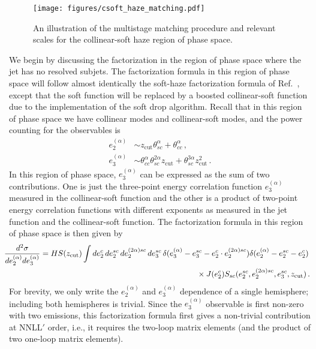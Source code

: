 \documentclass[a4paper,11pt]{article}
\newcommand{\ecf}[2]{e_{#1}^{(#2)}}
\newcommand{\nn}{\nonumber}
\def\zcut{z_{\text{cut}}}
\DeclareRobustCommand{\Ref}[1]{Ref.~\cite{#1}}
\begin{document}
\begin{figure}
\begin{center}
\texttt{[image: figures/csoft\_haze\_matching.pdf]}
\end{center}
\caption{An illustration of the multistage matching procedure and relevant scales for the collinear-soft haze region of phase space.
}
\label{fig:csoft_haze_setup}
\end{figure}

We begin by discussing the factorization in the region of phase space where the jet has no resolved subjets. The factorization formula in this region of phase space will follow almost identically the soft-haze factorization formula of \Ref{Larkoski:2015kga}, except that the soft function will be replaced by a boosted collinear-soft function due to the implementation of the soft drop algorithm. Recall that in this region of phase space we have collinear modes and collinear-soft modes, and the power counting for the observables is
\begin{align}
\ecf{2}{\alpha} &\sim \zcut \theta_{sc}^\alpha +\theta_{cc}^\alpha\,, \nn \\
\ecf{3}{\alpha} &\sim \theta_{cc}^\alpha \theta_{sc}^{2\alpha} \zcut+\theta_{sc}^{3\alpha} \zcut^2\,.
\end{align}
In this region of phase space, $\ecf{3}{\alpha}$ can be expressed as the sum of two contributions.  One is just the three-point energy correlation function $\ecf{3}{\alpha}$ measured in the collinear-soft function and the other is a product of two-point energy correlation functions with different exponents as measured in the jet function and the collinear-soft function.  The factorization formula in this region of phase space is then given by
\begin{align}\label{eq:fact_haze}
\hspace{-0.25cm}
\frac{d^2\sigma}{d\ecf{2}{\alpha} d\ecf{3}{\alpha}}&= H S(\zcut) \int de_2^c \, de_2^{sc}\, de_2^{(2\alpha) sc}\, de_3^{sc}\, \delta(\ecf{3}{\alpha}-e_3^{sc}-e_2^c\cdot  e_2^{(2\alpha) sc}  )  \delta(\ecf{2}{\alpha}-e_2^{sc}-e_2^c) \nonumber\\
& 
\hspace{7cm}
\times J(e_2^c) S_{sc}(e_2^{sc},e_2^{(2\alpha) sc}, e_3^{sc}, \zcut)\,. 
\end{align}
For brevity, we only write the $\ecf{2}{\alpha}$ and $\ecf{3}{\alpha}$ dependence of a single hemisphere; including both hemispheres is trivial.  Since the $\ecf{3}{\alpha}$ observable is first non-zero with two emissions, this factorization formula first gives a non-trivial contribution at NNLL$'$ order, i.e., it requires the two-loop matrix elements (and the product of two one-loop matrix elements).
\end{document}
